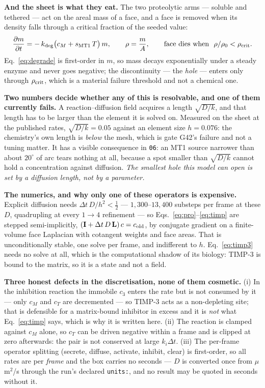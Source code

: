 \documentclass[10pt,a4paper]{article}
\newcommand{\code}[1]{\texttt{#1}}
\newcommand{\op}[1]{\texttt{#1}}
\begin{document}
\textbf{And the sheet is what they eat.} The two proteolytic arms --- soluble and tethered --- act on
the areal mass of a face, and a face is removed when its density falls through a critical fraction of
the seeded value:
%
\begin{equation}
\frac{\partial m}{\partial t} = -\,k_{\rm deg}\bigl(c_M + s_{\rm MT1}\,T\bigr)\,m,
\qquad
\rho = \frac{m}{A},\qquad
\text{face dies when }\ \rho/\rho_0 < \rho_{\rm crit}.
\label{eq:degrade}
\end{equation}
%
Eq.~\eqref{eq:degrade} is first-order in $m$, so mass decays exponentially under a steady enzyme and
never goes negative; the discontinuity --- the \emph{hole} --- enters only through $\rho_{\rm crit}$,
which is a material failure threshold and not a chemical one.

\textbf{Two numbers decide whether any of this is resolvable, and one of them currently fails.} A
reaction--diffusion field acquires a length $\sqrt{D/k}$, and that length has to be larger than the
element it is solved on. Measured on the sheet at the published rates, $\sqrt{D/k}=0.05$ against an
element size $h=0.076$: the chemistry's own length is \emph{below} the mesh, which is gate G42's
failure and not a tuning matter. It has a visible consequence in \op{06}: an MT1 source narrower than
about $20^\circ$ of arc tears nothing at all, because a spot smaller than $\sqrt{D/k}$ cannot hold a
concentration against diffusion. \emph{The smallest hole this model can open is set by a diffusion
length, not by a parameter.}

\textbf{The numerics, and why only one of these operators is expensive.} Explicit diffusion needs
$\Delta t\,D/h^2<\tfrac12$ --- $1{,}300$--$13{,}400$ substeps per frame at these $D$, quadrupling at
every $1\!\to\!4$ refinement --- so Eqs.~\eqref{eq:pro}--\eqref{eq:timp} are stepped semi-implicitly,
$(\mathbf I+\Delta t\,D\,\mathbf L)\,c = c_{\rm old}$, by conjugate gradient on a finite-volume face
Laplacian with cotangent weights and face areas. That is unconditionally stable, one solve per frame,
and indifferent to $h$. Eq.~\eqref{eq:timp3} needs no solve at all, which is the computational shadow
of its biology: TIMP-3 is bound to the matrix, so it is a state and not a field.

\textbf{Three honest defects in the discretisation, none of them cosmetic.} (i) In the inhibition
reaction the immobile $c_3$ enters the rate but is not consumed by it --- only $c_M$ and $c_T$ are
decremented --- so TIMP-3 acts as a non-depleting site; that is defensible for a matrix-bound
inhibitor in excess and it is \emph{not} what Eq.~\eqref{eq:timp} says, which is why it is written
here. (ii) The reaction is clamped against $c_M$ alone, so $c_T$ can be driven negative within a frame
and is clipped at zero afterwards: the pair is not conserved at large $k_i\Delta t$. (iii) The
per-frame operator splitting (secrete, diffuse, activate, inhibit, clear) is first-order, so all rates
are per \emph{frame} and the box carries no seconds --- $D$ is converted once from $\mu$m$^2$/s
through the run's declared \code{units:}, and no result may be quoted in seconds without it.
\end{document}
